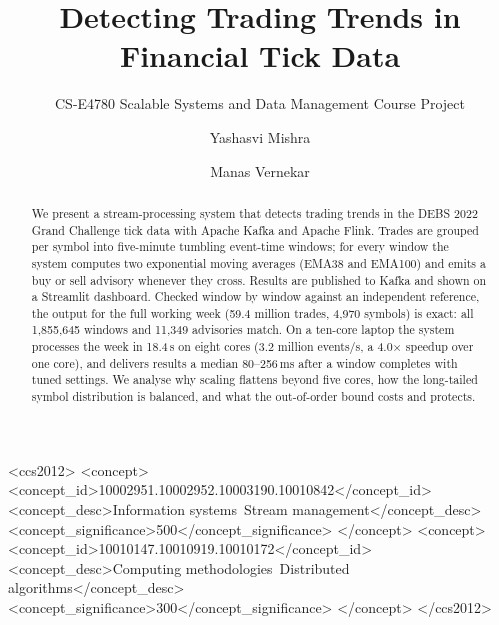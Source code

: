 \documentclass[sigconf]{acmart}
\begin{document}
\title{Detecting Trading Trends in Financial Tick Data}
\subtitle{\small CS-E4780 Scalable Systems and Data Management Course Project}

\author{Yashasvi Mishra}

\author{Manas Vernekar}

\renewcommand{\shortauthors}{}

\begin{abstract}
We present a stream-processing system that detects trading trends in the DEBS 2022 Grand Challenge tick data with Apache Kafka and Apache Flink. Trades are grouped per symbol into five-minute tumbling event-time windows; for every window the system computes two exponential moving averages (EMA38 and EMA100) and emits a buy or sell advisory whenever they cross. Results are published to Kafka and shown on a Streamlit dashboard. Checked window by window against an independent reference, the output for the full working week (59.4 million trades, 4,970 symbols) is exact: all 1,855,645 windows and 11,349 advisories match. On a ten-core laptop the system processes the week in 18.4\,s on eight cores (3.2 million events/s, a 4.0$\times$ speedup over one core), and delivers results a median 80--256\,ms after a window completes with tuned settings. We analyse why scaling flattens beyond five cores, how the long-tailed symbol distribution is balanced, and what the out-of-order bound costs and protects.
\end{abstract}

\begin{CCSXML}
<ccs2012>
<concept>
<concept_id>10002951.10002952.10003190.10010842</concept_id>
<concept_desc>Information systems~Stream management</concept_desc>
<concept_significance>500</concept_significance>
</concept>
<concept>
<concept_id>10010147.10010919.10010172</concept_id>
<concept_desc>Computing methodologies~Distributed algorithms</concept_desc>
<concept_significance>300</concept_significance>
</concept>
</ccs2012>
\end{CCSXML}

\end{document}
